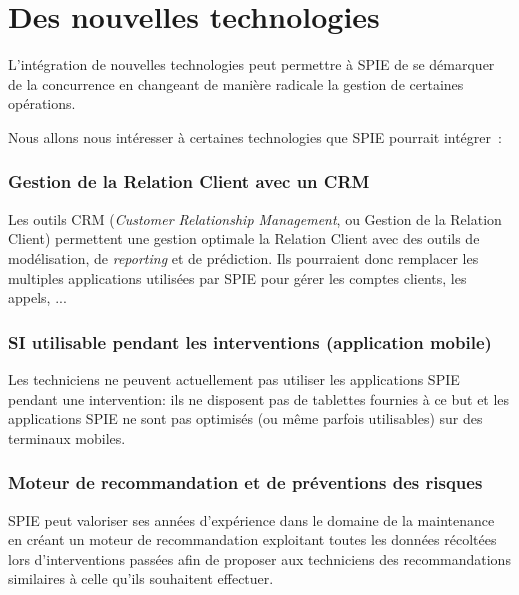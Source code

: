 \section{Des nouvelles technologies}

L'intégration de nouvelles technologies peut permettre à SPIE de se démarquer de la concurrence en changeant de manière radicale la gestion de certaines opérations.

Nous allons nous intéresser à certaines technologies que SPIE pourrait intégrer~:


    \subsubsection{Gestion de la Relation Client avec un CRM}

        Les outils CRM (\textit{Customer Relationship Management}, ou Gestion de la Relation Client) permettent une gestion optimale la Relation Client avec des outils de modélisation, de \textit{reporting} et de prédiction. Ils pourraient donc remplacer les multiples applications utilisées par SPIE pour gérer les comptes clients, les appels, ...

    \subsubsection{SI utilisable pendant les interventions (application mobile)}

        Les techniciens ne peuvent actuellement pas utiliser les applications SPIE pendant une intervention: ils ne disposent pas de tablettes fournies à ce but et les applications SPIE ne sont pas optimisés (ou même parfois utilisables) sur des terminaux mobiles.

    \subsubsection{Moteur de recommandation et de préventions des risques}

        SPIE peut valoriser ses années d'expérience dans le domaine de la maintenance en créant un moteur de recommandation exploitant toutes les données récoltées lors d'interventions passées afin de proposer aux techniciens des recommandations similaires à celle qu'ils souhaitent effectuer.


